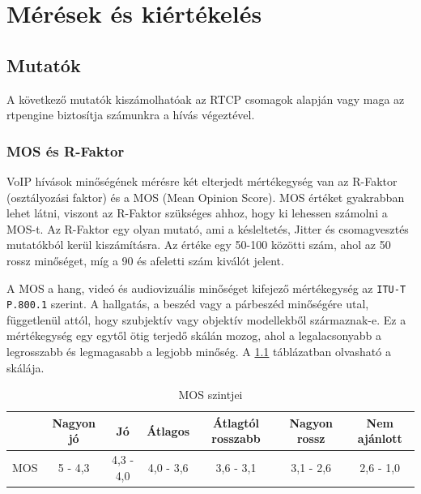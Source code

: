 \chapter{Mérések és kiértékelés}


\section{Mutatók}

A következő mutatók kiszámolhatóak az RTCP csomagok alapján vagy maga az rtpengine
biztosítja számunkra a hívás végeztével.

\subsection{MOS és R-Faktor}

VoIP hívások minőségének mérésre két elterjedt mértékegység van az R-Faktor (osztályozási 
faktor) és a MOS (Mean Opinion Score). MOS értéket gyakrabban lehet látni, viszont az 
R-Faktor szükséges ahhoz, hogy ki lehessen számolni a MOS-t. Az R-Faktor egy olyan 
mutató, ami a késleltetés, Jitter és csomagvesztés mutatókból kerül kiszámításra. Az 
értéke egy 50-100 közötti szám, ahol az 50 rossz minőséget, míg a 90 és afeletti szám 
kiválót jelent. 

A MOS a hang, videó és audiovizuális minőséget kifejező mértékegység az 
\texttt{ITU-T P.800.1} szerint. A hallgatás, a beszéd vagy a párbeszéd minőségére utal, 
függetlenül attól, hogy szubjektív vagy objektív modellekből származnak-e. Ez a
mértékegység egy egytől ötig terjedő skálán mozog, ahol a legalacsonyabb a legrosszabb
és legmagasabb a legjobb minőség. A \ref{tab:mosValues} táblázatban olvasható a skálája. 

\begin{table}[ht]
	\footnotesize
	\centering
	\begin{tabular}{l c c c c c c}
		\toprule
		 & Nagyon jó & Jó & Átlagos & Átlagtól rosszabb & Nagyon rossz & Nem ajánlott\\
		\midrule
		MOS & 5 - 4,3 & 4,3 - 4,0 & 4,0 - 3,6 & 3,6 - 3,1 & 3,1 - 2,6 & 2,6 - 1,0\\
		\bottomrule
	\end{tabular}
	\caption{MOS szintjei}
	\label{tab:mosValues}
\end{table}


